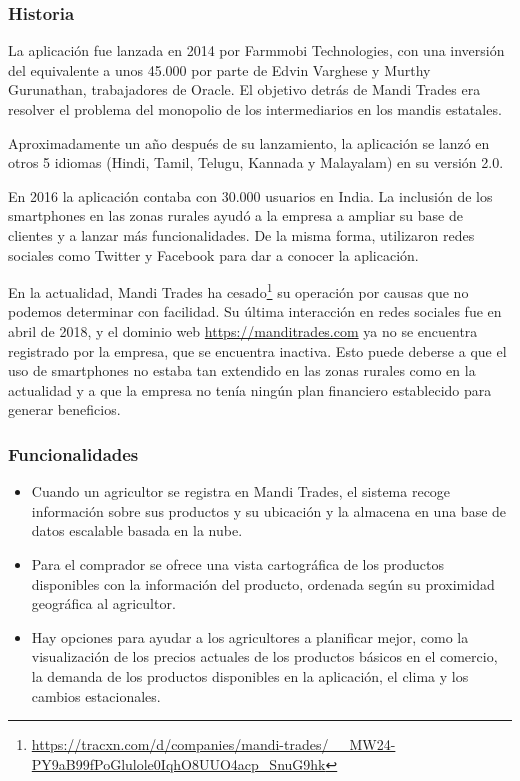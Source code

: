 \subsubsection{Historia}

La aplicación fue lanzada en 2014 por Farmmobi Technologies, con una inversión del equivalente a unos 45.000\geneuro{}  por parte de Edvin Varghese y Murthy Gurunathan, trabajadores de Oracle. El objetivo detrás de Mandi Trades era resolver el problema del monopolio de los intermediarios en los mandis estatales.

Aproximadamente un año después de su lanzamiento, la aplicación se lanzó en otros 5 idiomas (Hindi, Tamil, Telugu, Kannada y Malayalam) en su versión 2.0.

En 2016 la aplicación contaba con 30.000 usuarios en India. La inclusión de los smartphones en las zonas rurales ayudó a la empresa a ampliar su base de clientes y a lanzar más funcionalidades. De la misma forma, utilizaron redes sociales como Twitter y Facebook para dar a conocer la aplicación.

En la actualidad, Mandi Trades ha cesado\footnote{\url{https://tracxn.com/d/companies/mandi-trades/__MW24-PY9aB99fPoGlulole0IqhO8UUO4acp_SnuG9hk}} su operación por causas que no podemos determinar con facilidad. Su última interacción en redes sociales fue en abril de 2018, y el dominio web \url{https://manditrades.com} ya no se encuentra registrado por la empresa, que se encuentra inactiva. Esto puede deberse a que el uso de smartphones no estaba tan extendido en las zonas rurales como en la actualidad y a que la empresa no tenía ningún plan financiero establecido para generar beneficios.

\subsubsection{Funcionalidades}

\begin{itemize}

	\item Cuando un agricultor se registra en Mandi Trades, el sistema recoge información sobre sus productos y su ubicación y la almacena en una base de datos escalable basada en la nube.
	
	\item Para el comprador se ofrece una vista cartográfica de los productos disponibles con la información del producto, ordenada según su proximidad geográfica al agricultor.

	\item Hay opciones para ayudar a los agricultores a planificar mejor, como la visualización de los precios actuales de los productos básicos en el comercio, la demanda de los productos disponibles en la aplicación, el clima y los cambios estacionales.

\end{itemize}

